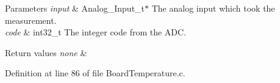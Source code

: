 \begin{DoxyParams}{Parameters}
{\em input} & Analog\-\_\-\-Input\-\_\-t$\ast$ The analog input which took the measurement. \\
\hline
{\em code} & int32\-\_\-t The integer code from the A\-D\-C. \\
\hline
\end{DoxyParams}

\begin{DoxyRetVals}{Return values}
{\em none} & \\
\hline
\end{DoxyRetVals}


Definition at line 86 of file Board\-Temperature.\-c.

